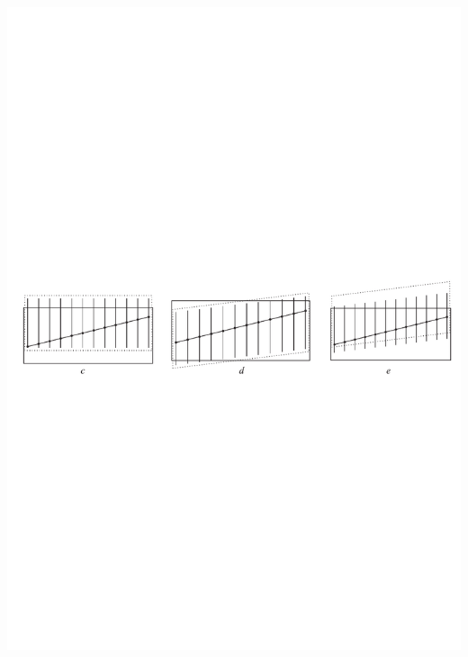 \documentclass[dvipsnames, aspectratio=43] {beamer}
\begin{document}
\begin{frame}
\begin{columns}[t]
\begin{block}{\bf {}}
      \includegraphics[width=1.\linewidth]{alsoPossibleSolutions.pdf}
    \end{block}
  \end{columns}
\end{frame}
\end{document}
